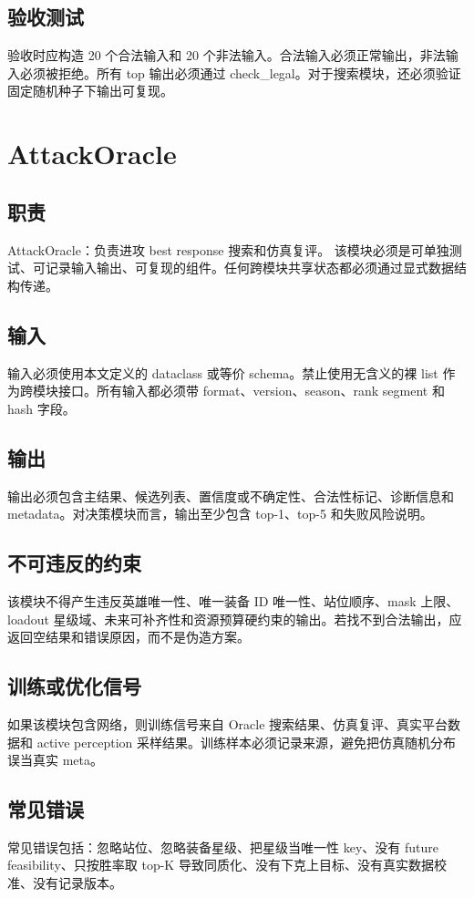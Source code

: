 \documentclass[UTF8,12pt,openany]{ctexbook}
\begin{document}
\subsection{验收测试}
验收时应构造 20 个合法输入和 20 个非法输入。合法输入必须正常输出，非法输入必须被拒绝。所有 top 输出必须通过 check\_legal。对于搜索模块，还必须验证固定随机种子下输出可复现。

\section{AttackOracle}
\subsection{职责}
AttackOracle：负责进攻 best response 搜索和仿真复评。 该模块必须是可单独测试、可记录输入输出、可复现的组件。任何跨模块共享状态都必须通过显式数据结构传递。

\subsection{输入}
输入必须使用本文定义的 dataclass 或等价 schema。禁止使用无含义的裸 list 作为跨模块接口。所有输入都必须带 format、version、season、rank segment 和 hash 字段。

\subsection{输出}
输出必须包含主结果、候选列表、置信度或不确定性、合法性标记、诊断信息和 metadata。对决策模块而言，输出至少包含 top-1、top-5 和失败风险说明。

\subsection{不可违反的约束}
该模块不得产生违反英雄唯一性、唯一装备 ID 唯一性、站位顺序、mask 上限、loadout 星级域、未来可补齐性和资源预算硬约束的输出。若找不到合法输出，应返回空结果和错误原因，而不是伪造方案。

\subsection{训练或优化信号}
如果该模块包含网络，则训练信号来自 Oracle 搜索结果、仿真复评、真实平台数据和 active perception 采样结果。训练样本必须记录来源，避免把仿真随机分布误当真实 meta。

\subsection{常见错误}
常见错误包括：忽略站位、忽略装备星级、把星级当唯一性 key、没有 future feasibility、只按胜率取 top-K 导致同质化、没有下克上目标、没有真实数据校准、没有记录版本。
\end{document}
